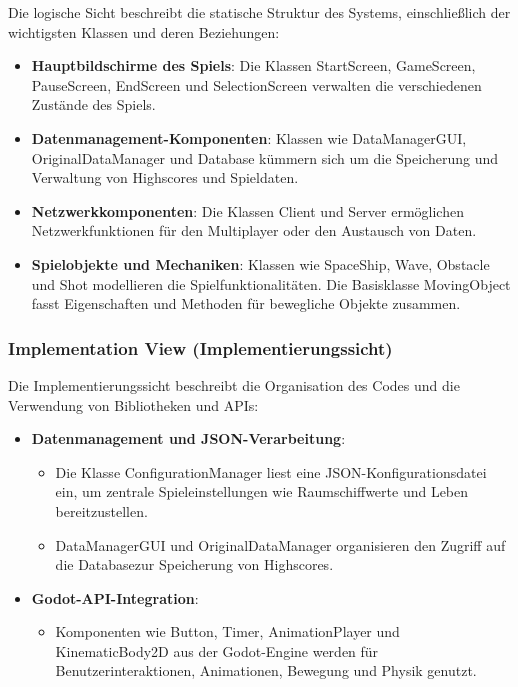 \documentclass[10pt]{article}
\begin{document}
Die logische Sicht beschreibt die statische Struktur des Systems, einschließlich der wichtigsten Klassen und deren Beziehungen:
\begin{itemize}
    \item \textbf{Hauptbildschirme des Spiels}: Die Klassen StartScreen, GameScreen, PauseScreen, EndScreen und SelectionScreen verwalten die verschiedenen Zustände des Spiels.
    \item \textbf{Datenmanagement-Komponenten}: Klassen wie DataManagerGUI, OriginalDataManager und Database kümmern sich um die Speicherung und Verwaltung von Highscores und Spieldaten.
    \item \textbf{Netzwerkkomponenten}: Die Klassen Client und Server ermöglichen Netzwerkfunktionen für den Multiplayer oder den Austausch von Daten.
    \item \textbf{Spielobjekte und Mechaniken}: Klassen wie SpaceShip, Wave, Obstacle und Shot modellieren die Spielfunktionalitäten. Die Basisklasse MovingObject fasst Eigenschaften und Methoden für bewegliche Objekte zusammen.
\end{itemize}

\subsubsection{Implementation View (Implementierungssicht)}

Die Implementierungssicht beschreibt die Organisation des Codes und die Verwendung von Bibliotheken und APIs:
\begin{itemize}
    \item \textbf{Datenmanagement und JSON-Verarbeitung}:
    \begin{itemize}
        \item Die Klasse ConfigurationManager liest eine JSON-Konfigurationsdatei ein, um zentrale Spieleinstellungen wie Raumschiffwerte und Leben bereitzustellen.
        \item DataManagerGUI und OriginalDataManager organisieren den Zugriff auf die Database\footnotemark[5] zur Speicherung von Highscores.
    \end{itemize}
    \item \textbf{Godot-API-Integration\footnotemark[6]}:
    \begin{itemize}
        \item Komponenten wie Button, Timer, AnimationPlayer und KinematicBody2D aus der Godot-Engine werden für Benutzerinteraktionen, Animationen, Bewegung und Physik genutzt.
    \end{itemize}
\end{itemize}
\end{document}
